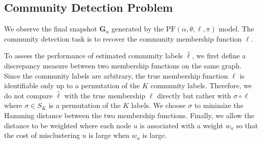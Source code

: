 \documentclass[twoside,11pt]{article}
\theoremstyle{remark}
\begin{document}



\subsection{Community Detection Problem}

We observe the final snapshot $\boldsymbol{G}_n$ generated by the $\mathrm{PF}(\alpha,\theta,\ell,\pi)$ model. The community detection task is to recover the community membership function $\ell$. 

To assess the performance of estimated community labels $\hat{\ell}$, we first define a discrepancy measure between two membership functions on the same graph. Since the community labels are arbitrary, the true membership function $\ell$ is identifiable only up to a permutation of the $K$ community labels. Therefore, we do not compare $\hat{\ell}$ with the true membership $\ell$ directly but rather with $\sigma \circ \ell$ where $\sigma \in {S}_K$ is a permutation of the $K$ labels. We choose $\sigma$ to minimize the Hamming distance between the two membership functions. Finally, we allow the distance to be weighted where each node $u$ is associated with a weight $w_u$ so that the cost of misclustering $u$ is large when $w_u$ is large. 
\end{document}
